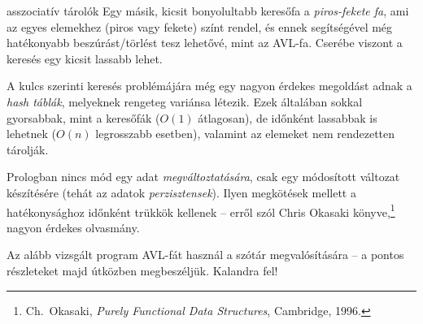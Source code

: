 \begin{infobox}{}{asszociatív tárolók}
Egy másik, kicsit bonyolultabb keresőfa a
\emph{piros-fekete fa}, ami az egyes elemekhez
(piros vagy fekete) színt rendel, és ennek
segítségével még hatékonyabb beszúrást/törlést tesz
lehetővé, mint az AVL-fa. Cserébe viszont a keresés
egy kicsit lassabb lehet.

A kulcs szerinti keresés problémájára még egy nagyon
érdekes megoldást adnak a \emph{hash táblák},
melyeknek rengeteg variánsa létezik. Ezek általában
sokkal gyorsabbak, mint a keresőfák ($O(1)$
átlagosan), de időnként lassabbak is lehetnek
($O(n)$ legrosszabb esetben), valamint az elemeket
nem rendezetten tárolják.

Prologban nincs mód egy adat
\emph{megváltoztatására}, csak egy módosított
változat készítésére (tehát az adatok
\emph{perzisztensek}). Ilyen
megkötések mellett a hatékonysághoz időnként trükkök
kellenek -- erről szól Chris Okasaki
könyve,\footnote[2]{Ch.~Okasaki, \emph{Purely
  Functional Data Structures}, Cambridge, 1996.}
nagyon érdekes olvasmány.
\end{infobox}

Az alább vizsgált program AVL-fát használ a szótár
megvalósítására -- a pontos részleteket majd
útközben megbeszéljük. Kalandra fel!

